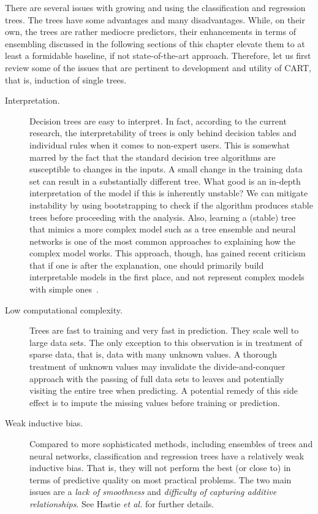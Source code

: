 \begin{refsection}
There are several issues with growing and using the classification and regression trees. The trees have some advantages and many disadvantages. While, on their own, the trees are rather mediocre predictors, their enhancements in terms of ensembling discussed in the following sections of this chapter elevate them to at least a formidable baseline, if not state-of-the-art approach. Therefore, let us first review some of the issues that are pertinent to development and utility of CART, that is, induction of single trees.

\begin{description}
\item[Interpretation.] Decision trees are easy to interpret. In fact, according to the current research, the interpretability of trees is only behind decision tables and individual rules when it comes to non-expert users. This is somewhat marred by the fact that the standard decision tree algorithms are susceptible to changes in the inputs. A small change in the training data set can result in a substantially different tree. What good is an in-depth interpretation of the model if this is inherently unstable? We can mitigate instability by using bootstrapping to check if the algorithm produces stable trees before proceeding with the analysis. Also, learning a (stable) tree that mimics a more complex model such as a tree ensemble and neural networks is one of the most common approaches to explaining how the complex model works. This approach, though, has gained recent criticism that if one is after the explanation, one should primarily build interpretable models in the first place, and not represent complex models with simple ones~\cite{Rudin2019}.

\item[Low computational complexity.] Trees are fast to training and very fast in prediction. They scale well to large data sets. The only exception to this observation is in treatment of sparse data, that is, data with many unknown values. A thorough treatment of unknown values may invalidate the divide-and-conquer approach with the passing of full data sets to leaves and potentially visiting the entire tree when predicting. A potential remedy of this side effect is to impute the missing values before training or prediction.

\item[Weak inductive bias.] Compared to more sophisticated methods, including ensembles of trees and neural networks, classification and regression trees have a relatively weak inductive bias. That is, they will not perform the best (or close to) in terms of predictive quality on most practical problems. The two main issues are a {\em lack of smoothness} and {\em difficulty of capturing additive relationships}. See Hastie {\em et al.} for further details.


\end{description}
\end{refsection}

